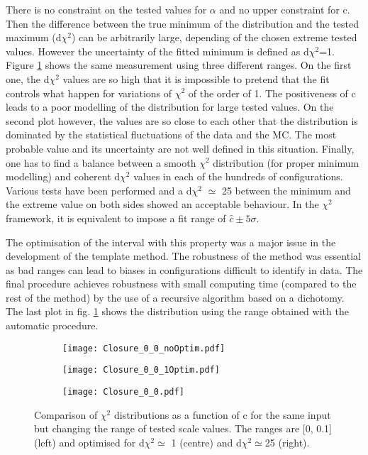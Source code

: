 There is no constraint on the tested values for \(\alpha\) and no upper constraint for c.
Then the difference between the true minimum of the distribution and the tested maximum (d$\chi^2$) can be arbitrarily large, depending of the chosen extreme tested values.
However the uncertainty of the fitted minimum is defined  as d$\chi^2$=1.
Figure \ref{org010bed5} shows the same measurement using three different ranges.
On the first one, the d$\chi^2$ values are so high that it is impossible to pretend that the fit controls what happen for variations of $\chi^2$ of the order of 1.
The positiveness of c leads to a poor modelling of the distribution for large tested values.
On the second plot however, the values are so close to each other that the distribution is dominated by the statistical fluctuations of the data and the MC.
The most probable value and its uncertainty are not well defined in this situation.
Finally, one has to find a balance between a smooth $\chi^2$ distribution (for proper minimum modelling) and coherent d$\chi^2$ values in each of the hundreds of configurations.
Various tests have been performed and a d$\chi^2$ \(\simeq\) 25 between the minimum and the extreme value on both sides showed an acceptable behaviour.
In the $\chi^2$ framework, it is equivalent to impose a fit range of $\hat{c}\pm 5\sigma$.

The optimisation of the interval with this property was a major issue in the development of the template method.
The robustness of the method was essential as bad ranges can lead to biases in configurations difficult to identify in data.
The final procedure achieves robustness with small computing time (compared to the rest of the method) by the use of a recursive algorithm based on a dichotomy.
The last plot in fig. \ref{org010bed5} shows the distribution using the range obtained with the automatic procedure.

\begin{figure}
\begin{subfigure}[t]{0.32\linewidth}
\begin{center}
\texttt{[image: Closure\_0\_0\_noOptim.pdf]}
\end{center}
\end{subfigure}
\begin{subfigure}[t]{0.32\linewidth}
\begin{center}
\texttt{[image: Closure\_0\_0\_1Optim.pdf]}
\end{center}
\end{subfigure}
\begin{subfigure}[t]{0.32\linewidth}
\begin{center}
\texttt{[image: Closure\_0\_0.pdf]}
\end{center}
\end{subfigure}
\caption{\label{org010bed5}
Comparison of $\chi^2$ distributions as a function of c for the same input but changing the range of tested scale values. The ranges are [0, 0.1] (left) and optimised for d\(\chi^{\text{2}} \simeq\) 1 (centre) and d\(\chi^{\text{2}} \simeq\)25 (right).}
\end{figure}


